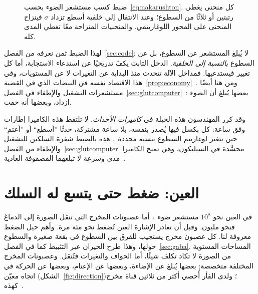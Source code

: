 \begin{figure}[t]
\centering
{}
\caption{ضبط كسب مستشعر الضوء بحسب~\eqref{eq:nakarushton}. كل منحنى يغطي رتبتين أو ثلاثًا من السطوع؛ وعند الانتقال إلى خلفية أسطع تزداد $\sigma$ فينزاح المنحنى على المحور اللوغاريتمي. والمنحنيات المنزاحة معًا تغطي المدى كله.}
\label{fig:adaptation}
\end{figure}

لهذا الضبط ثمن نعرفه من الفصل~\ref{sec:code}: لا يُبلغ المستشعر عن السطوع، بل عن السطوع \emph{بالنسبة إلى الخلفية}. الدخل الثابت يكفّ تدريجيًا عن استدعاء الاستجابة، أما كل تغيير فيستدعيها. فمداخل الآلة تتحدث منذ البداية عن التغيرات لا عن المستويات، وفي هذا الاقتصاد نفسه في النبضات الذي في القضية~\ref{prop:economy}~\cite{Barlow1961}. ومن هنا أيضًا مستشعرات التشغيل والإطفاء في الفصل~\ref{sec:glutcomputer}~\cite{Schiller1992}: بعضها يُبلغ أن الضوء ازداد، وبعضها أنه خفت.

وقد كرر المهندسون هذه الحيلة في \emph{كاميرات الأحداث}. لا تلتقط هذه الكاميرا إطارات وفق ساعة: كل بكسل فيها يُصدر بنفسه، بلا ساعة مشتركة، حدثًا ”أسطع“ أو ”أعتم“ حين يتغير لوغاريتم السطوع بنسبة محددة~\cite{Lichtsteiner2008}. هذه بالضبط شفرة السلكين للتشغيل والإطفاء من الفصل~\ref{sec:glutcomputer} مجسَّدة في السيليكون، وهي تمنح الكاميرا مدى وسرعة لا تبلغهما المصفوفة العادية~\cite{Gallego2022}.

\section{العين: ضغط حتى يتسع له السلك}

في العين نحو $10^8$ مستشعر ضوء~\cite{Curcio1990}، أما عصبونات المخرج التي تنقل الصورة إلى الدماغ فنحو مليون. وقبل أن تغادر الإشارة العين تُضغط نحو مئة مرة. وأهم حيل الضغط معروفة لنا. كل عصبون مخرج يستجيب للفرق بين السطوع في بقعة صغيرة والسطوع حولها، وهذا طرح الجيران عبر التثبيط كما في الفصل~\ref{sec:gaba}. المساحات المستوية من الصورة لا تكاد تكلف شيئًا، أما الحواف والتغيرات فتُنقل. وعصبونات المخرج المختلفة متخصصة: بعضها يُبلغ عن الإضاءة، وبعضها عن الإعتام، وبعضها عن الحركة في اتجاه معيّن (الشكل~\ref{fig:direction})؛ ولدى الفأر أُحصي أكثر من ثلاثين قناة مخرج كهذه~\cite{Baden2016}.

